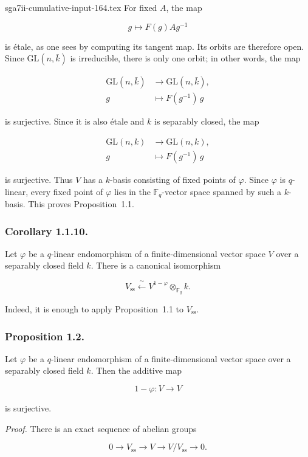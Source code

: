 \begin{filecontents*}{sga7ii-cumulative-input-164.tex}
For fixed $A$, the map

\begin{equation}\tag{1.1.7}
g\longmapsto F(g)Ag^{-1}
\end{equation}

is étale, as one sees by computing its tangent map. Its orbits are therefore
open. Since $\mathrm{GL}(n,\bar k)$ is irreducible, there is only one orbit;
in other words, the map

\begin{equation}\tag{1.1.8}
\begin{aligned}
\mathrm{GL}(n,\bar k)&\longrightarrow\mathrm{GL}(n,\bar k),\\
g&\longmapsto F(g^{-1})\,g
\end{aligned}
\end{equation}

is surjective. Since it is also étale and $k$ is separably closed, the map

\begin{equation}\tag{1.1.9}
\begin{aligned}
\mathrm{GL}(n,k)&\longrightarrow\mathrm{GL}(n,k),\\
g&\longmapsto F(g^{-1})\,g
\end{aligned}
\end{equation}

is surjective. Thus $V$ has a $k$-basis consisting of fixed points of
$\varphi$. Since $\varphi$ is $q$-linear, every fixed point of $\varphi$ lies
in the $\mathbb F_q$-vector space spanned by such a $k$-basis. This proves
Proposition~1.1.

\subsubsection*{Corollary 1.1.10.}
Let $\varphi$ be a $q$-linear endomorphism of a finite-dimensional vector
space $V$ over a separably closed field $k$. There is a canonical
isomorphism

\begin{equation}\tag{1.1.11}
V_{\mathrm{ss}}\xleftarrow{\ \sim\ }
V^{1-\varphi}\otimes_{\mathbb F_q}k.
\end{equation}

Indeed, it is enough to apply Proposition~1.1 to $V_{\mathrm{ss}}$.

\subsubsection*{Proposition 1.2.}
Let $\varphi$ be a $q$-linear endomorphism of a finite-dimensional vector
space over a separably closed field $k$. Then the additive map

\[
1-\varphi:V\longrightarrow V
\]

is surjective.

\medskip
\noindent\emph{Proof.}
There is an exact sequence of abelian groups

\[
0\longrightarrow V_{\mathrm{ss}}\longrightarrow V
\longrightarrow V/V_{\mathrm{ss}}\longrightarrow0.
\]
\end{filecontents*}
